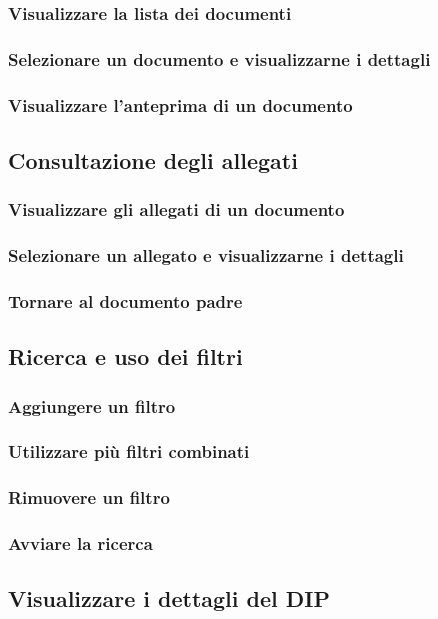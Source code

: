 \documentclass[a4paper,12pt]{article}
\begin{document}
            \subsubsection{Visualizzare la lista dei documenti}
            \subsubsection{Selezionare un documento e visualizzarne i dettagli}
            \subsubsection{Visualizzare l'anteprima di un documento}

        \subsection{Consultazione degli allegati}
            \subsubsection{Visualizzare gli allegati di un documento}
            \subsubsection{Selezionare un allegato e visualizzarne i dettagli}
            \subsubsection{Tornare al documento padre}
        
        \subsection{Ricerca e uso dei filtri}
            \subsubsection{Aggiungere un filtro}
            \subsubsection{Utilizzare più filtri combinati}
            \subsubsection{Rimuovere un filtro}
            \subsubsection{Avviare la ricerca}
            
        \subsection{Visualizzare i dettagli del DIP}
\end{document}

